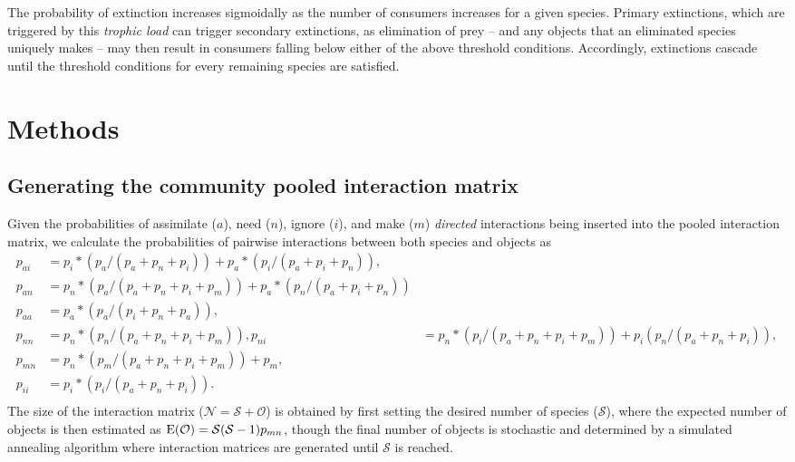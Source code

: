 \documentclass[twocolumn,preprintnumbers,amsmath,amssymb,superscriptaddress]{revtex4-1}
\begin{document}
The probability of extinction increases sigmoidally as the number of consumers increases for a given species.
Primary extinctions, which are triggered by this \emph{trophic load} can trigger secondary extinctions, as elimination of prey -- and any objects that an eliminated species uniquely makes -- may then result in consumers falling below either of the above threshold conditions.
Accordingly, extinctions cascade until the threshold conditions for every remaining species are satisfied.



\section{Methods}
\subsection{Generating the community pooled interaction matrix}
Given the probabilities of assimilate ($a$), need ($n$), ignore ($i$), and make ($m$) \emph{directed} interactions being inserted into the pooled interaction matrix, we calculate the probabilities of pairwise interactions between both species and objects as 
\begin{align}
  p_{ai} &= p_i*(p_a/(p_a+p_n+p_i)) + p_a*(p_i/(p_a+p_i+p_n)),\\ \nonumber
  p_{an} &= p_n*(p_a/(p_a+p_n+p_i+p_m)) + p_a*(p_n/(p_a+p_i+p_n))\\ \nonumber
  p_{aa} &= p_a*(p_a/(p_i+p_n+p_a)),\\ \nonumber
  p_{nn} &= p_n*(p_n/(p_a+p_n+p_i+p_m)),
  p_{ni} &= p_n*(p_i/(p_a+p_n+p_i+p_m)) + p_i(p_n/(p_a+p_n+p_i)),\\ \nonumber
  p_{mn} &= p_n*(p_m/(p_a+p_n+p_i+p_m)) + p_m,\\ \nonumber
  p_{ii} &= p_i*(p_i/(p_a+p_n+p_i)).\\ \nonumber
\end{align}
The size of the interaction matrix ($\mathcal{N} = \mathcal{S} + \mathcal{O}$) is obtained by first setting the desired number of species ($\mathcal{S}$), where the expected number of objects is then estimated as ${\rm E}(\mathcal{O}) = \mathcal{S}(\mathcal{S}-1)p_{mn}$, though the final number of objects is stochastic and determined by a simulated annealing algorithm where interaction matrices are generated until $\mathcal{S}$ is reached.
\end{document}
